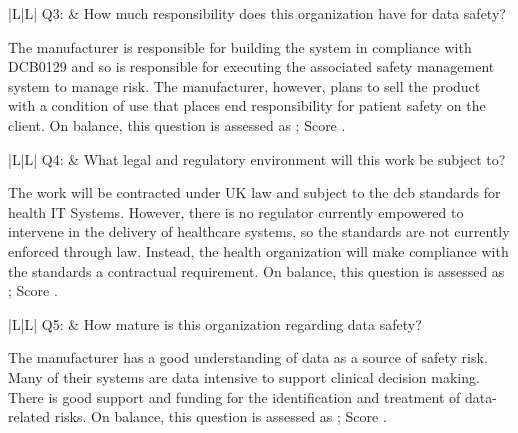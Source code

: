 \addtocounter{table}{-1} %
\begin{longtable*}[H]
	{|L{}|L{}|}
	\hline
	Q3: & How much responsibility does this organization have for data safety?\\
	\hline
\end{longtable*}

The manufacturer is responsible for building the system in compliance with
DCB0129 \cite{citation:dcb0129clinical}
and so is responsible for executing the associated safety management system to manage risk. The manufacturer, however, plans to sell the product with a condition of use that places end responsibility for patient safety on the client. On balance, this question is assessed as ; Score .

\addtocounter{table}{-1} %
\begin{longtable*}[H]
	{|L{}|L{}|}
	\hline
	Q4: & What legal and regulatory environment will this work be subject to?\\
	\hline
\end{longtable*}

The work will be contracted under UK law and subject to the \gls{dcb}
standards for health IT Systems. However, there is no regulator currently empowered to intervene in the delivery of healthcare systems, so the standards are not currently enforced through law. Instead, the health organization will make compliance with the standards a contractual requirement. On balance, this question is assessed as ; Score .

\addtocounter{table}{-1} %
\begin{longtable*}[H]
	{|L{}|L{}|}
	\hline
	Q5: & How mature is this organization regarding data safety?\\
	\hline
\end{longtable*}

The manufacturer has a good understanding of data as a source of safety risk. Many of their systems are data intensive to support clinical decision making. There is good support and funding for the identification and treatment of data-related risks. On balance, this question is assessed as ; Score .

